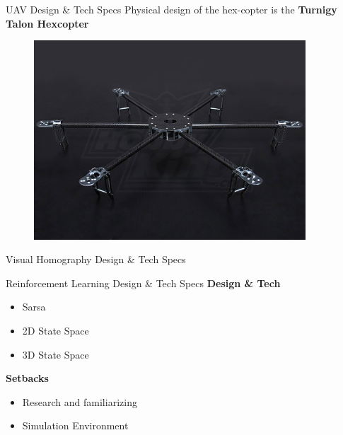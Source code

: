 \documentclass[11pt]{beamer}
\begin{document}
\begin{frame}{UAV Design \& Tech Specs}
	Physical design of the hex-copter is the \textbf{Turnigy Talon Hexcopter}
	
	\begin{figure}
		\includegraphics[width=4in]{images/TalonV1.jpg}
	\end{figure}

\end{frame}

\begin{frame}{Visual Homography Design \& Tech Specs}

\end{frame}

\begin{frame}{Reinforcement Learning Design \& Tech Specs}
\large{\textbf{Design \& Tech}}
	\begin{itemize}
		\item Sarsa
		\item 2D State Space
		\item 3D State Space
	\end{itemize}
\large{\textbf{Setbacks}}
	\begin{itemize}
		\item Research and familiarizing
		\item Simulation Environment
	\end{itemize}
\end{frame}
\end{document}

